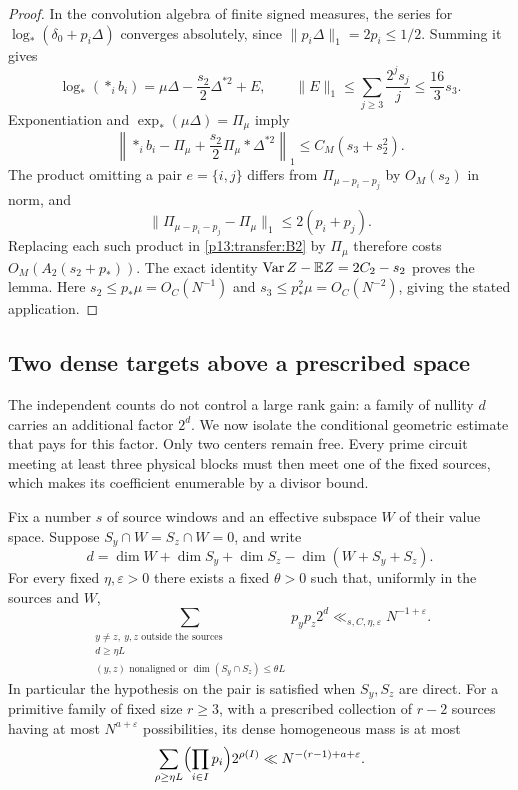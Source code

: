 \begin{proof}
In the convolution algebra of finite signed measures, the series for
$\log_*(\delta_0+p_i\Delta)$ converges absolutely, since
$\|p_i\Delta\|_1=2p_i\leq1/2$. Summing it gives
\[
 \log_*\left(\mathop{*}_ib_i\right)
   =\mu\Delta-\frac{s_2}{2}\Delta^{*2}+E,
 \qquad \|E\|_1\leq\sum_{j\geq3}\frac{2^js_j}{j}
                   \leq\frac{16}{3}s_3.
\]
Exponentiation and $\exp_*(\mu\Delta)=\Pi_\mu$ imply
\[
 \left\|\mathop{*}_ib_i-\Pi_\mu
              +\frac{s_2}{2}\Pi_\mu*\Delta^{*2}\right\|_1
 \leq C_M(s_3+s_2^2).
\]
The product omitting a pair $e=\{i,j\}$ differs from
$\Pi_{\mu-p_i-p_j}$ by $O_M(s_2)$ in norm, and
\[
 \|\Pi_{\mu-p_i-p_j}-\Pi_\mu\|_1\leq2(p_i+p_j).
\]
Replacing each such product in \eqref{p13:transfer:B2} by $\Pi_\mu$
therefore costs $O_M(A_2(s_2+p_*))$. The exact identity
$\operatorname{Var} Z-\mathbb E Z=2C_2-s_2$ proves the lemma.
Here $s_2\leq p_*\mu=O_C(N^{-1})$ and
$s_3\leq p_*^2\mu=O_C(N^{-2})$, giving the stated application.
\end{proof}

\subsection{Two dense targets above a prescribed space}

The independent counts do not control a large rank gain: a family of
nullity $d$ carries an additional factor $2^d$. We now isolate the
conditional geometric estimate that pays for this factor. Only two
centers remain free. Every prime circuit meeting at least three
physical blocks must then meet one of the fixed sources, which makes
its coefficient enumerable by a divisor bound.

\begin{lemma}
\label{p13:transfer:dense-targets}
Fix a number $s$ of source windows and an effective subspace $W$ of
their value space. Suppose $S_y\cap W=S_z\cap W=0$, and write
\[
 d=\dim W+\dim S_y+\dim S_z-\dim(W+S_y+S_z).
\]
For every fixed $\eta,\varepsilon>0$ there exists a fixed $\theta>0$
such that, uniformly in the sources and $W$,
\begin{equation}
 \sum_{\substack{y\ne z,\ y,z\text{ outside the sources}\\
             d\geq\eta L\\
             (y,z)\text{ nonaligned or }\dim(S_y\cap S_z)\leq\theta L}}
         p_yp_z2^d\ll_{s,C,\eta,\varepsilon}N^{-1+\varepsilon}.
 \label{p13:transfer:dense-target-bound}
\end{equation}
In particular the hypothesis on the pair is satisfied when $S_y,S_z$
are direct. For a primitive family of fixed size $r\geq3$, with a
prescribed collection of $r-2$ sources having at most $N^{a+\varepsilon}$
possibilities, its dense homogeneous mass is at most
\begin{equation}
 \sum_{\rho\geq\eta L}\Bigl(\prod_{i\in I}p_i\Bigr)2^{\rho(I)}
          \ll N^{-(r-1)+a+\varepsilon}.
 \label{p13:transfer:restricted-dense}
\end{equation}
\end{lemma}

